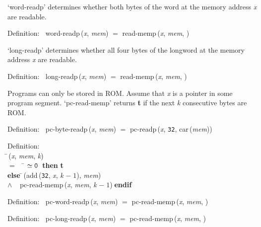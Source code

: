  `word-readp' determines whether both bytes of the word at the memory address {\it{x\/}} are readable.
\begin{tabbing}{\sc Definition}:$\;\;$
{\rm{word-readp}}\,({\it{x\/}}, {\it{mem\/}}) $=$ {\rm{read-memp}}\,({\it{x\/}}, {\it{mem\/}}, {})
\end{tabbing}

 `long-readp' determines whether all four bytes of the longword at the memory address {\it{x\/}} are readable.
\begin{tabbing}{\sc Definition}:$\;\;$
{\rm{long-readp}}\,({\it{x\/}}, {\it{mem\/}}) $=$ {\rm{read-memp}}\,({\it{x\/}}, {\it{mem\/}}, {})
\end{tabbing}

 Programs can only be stored in ROM.  Assume that {\it{x\/}} is a pointer
 in some program segment.  `pc-read-memp' returns {\bf{t}} if the next {\it{k\/}}
 consecutive bytes are ROM.
\begin{tabbing}{\sc Definition}:$\;\;$
{\rm{pc-byte-readp}}\,({\it{x\/}}, {\it{mem\/}}) $=$ {\rm{pc-readp}}\,({\it{x\/}}, {\tt{32}}, {\rm{car}}\,({\it{mem\/}}))
\end{tabbing}

\begin{tabbing}{\sc Definition}: \\  
\=\,({\it{x\/}}, {\it{mem\/}}, {\it{k\/}}) \\ 
$=$$\;\;\;\;$\= $\simeq {\tt{0}}$$\;\;${\bf then }{\bf{t}} \\ 
{\bf else }\=\,({\rm{add}}\,({\tt{32}}, {\it{x\/}}, {\it{k\/}} $-\;1$), {\it{mem\/}}) \\ 
$\wedge$$\;\;\;\;${\rm{pc-read-memp}}\,({\it{x\/}}, {\it{mem\/}}, {\it{k\/}} $-\;1$)\-$\;${\bf  endif}\-\-
\end{tabbing}

\begin{tabbing}{\sc Definition}:$\;\;$
{\rm{pc-word-readp}}\,({\it{x\/}}, {\it{mem\/}}) $=$ {\rm{pc-read-memp}}\,({\it{x\/}}, {\it{mem\/}}, {})
\end{tabbing}

\begin{tabbing}{\sc Definition}:$\;\;$
{\rm{pc-long-readp}}\,({\it{x\/}}, {\it{mem\/}}) $=$ {\rm{pc-read-memp}}\,({\it{x\/}}, {\it{mem\/}}, {})
\end{tabbing}

